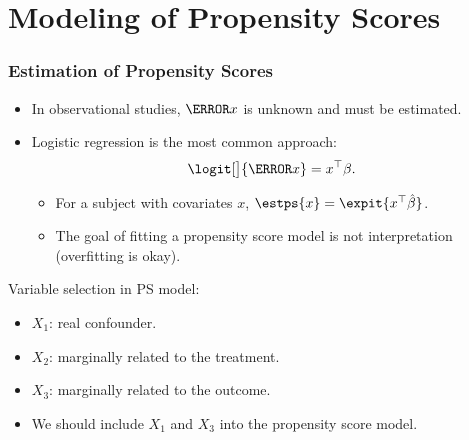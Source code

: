 \section{Modeling of Propensity Scores}
\subsubsection*{Estimation of Propensity Scores}
\begin{itemize}
      \item In observational studies, $ \ps{x} $ is unknown and must be
            estimated.
      \item Logistic regression is the most common approach:
            \[ \logit[\big]{\ps{x}}=x^\top \beta. \]
            \begin{itemize}
                  \item For a subject with covariates $ x $, $ \estps{x}=\expit{x^\top \hat{\beta}} $.
                  \item The goal of fitting a propensity score model is not interpretation (overfitting is okay).
            \end{itemize}
\end{itemize}
Variable selection in PS model:
\begin{center}
\end{center}
\begin{itemize}
      \item $ X_1 $: real confounder.
      \item $ X_2 $: marginally related to the treatment.
      \item $ X_3 $: marginally related to the outcome.
      \item We should include $ X_1 $ and $ X_3 $ into the propensity score model.
\end{itemize}
